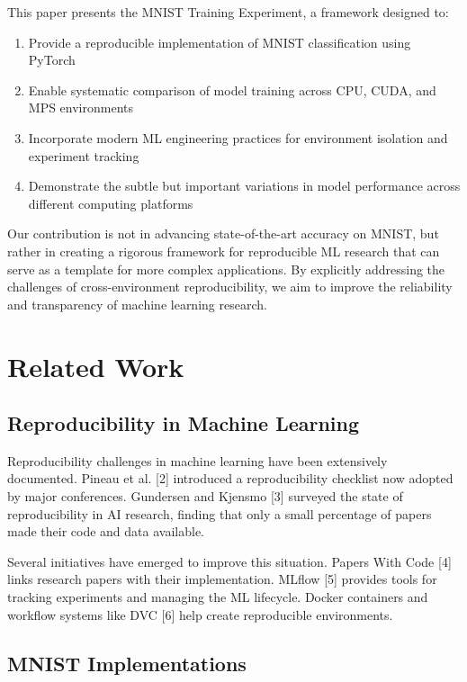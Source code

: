 \documentclass[
]{article}
\providecommand{\tightlist}{%
  \setlength{\itemsep}{0pt}\setlength{\parskip}{0pt}}\usepackage{longtable,booktabs,array}
\begin{document}
This paper presents the MNIST Training Experiment, a framework designed
to:

\begin{enumerate}
\def\labelenumi{\arabic{enumi}.}
\tightlist
\item
  Provide a reproducible implementation of MNIST classification using
  PyTorch
\item
  Enable systematic comparison of model training across CPU, CUDA, and
  MPS environments
\item
  Incorporate modern ML engineering practices for environment isolation
  and experiment tracking
\item
  Demonstrate the subtle but important variations in model performance
  across different computing platforms
\end{enumerate}

Our contribution is not in advancing state-of-the-art accuracy on MNIST,
but rather in creating a rigorous framework for reproducible ML research
that can serve as a template for more complex applications. By
explicitly addressing the challenges of cross-environment
reproducibility, we aim to improve the reliability and transparency of
machine learning research.

\section{Related Work}\label{sec-related}

\subsection{Reproducibility in Machine
Learning}\label{reproducibility-in-machine-learning}

Reproducibility challenges in machine learning have been extensively
documented. Pineau et al. {[}2{]} introduced a reproducibility checklist
now adopted by major conferences. Gundersen and Kjensmo {[}3{]} surveyed
the state of reproducibility in AI research, finding that only a small
percentage of papers made their code and data available.

Several initiatives have emerged to improve this situation. Papers With
Code {[}4{]} links research papers with their implementation. MLflow
{[}5{]} provides tools for tracking experiments and managing the ML
lifecycle. Docker containers and workflow systems like DVC {[}6{]} help
create reproducible environments.

\subsection{MNIST Implementations}\label{mnist-implementations}
\end{document}
